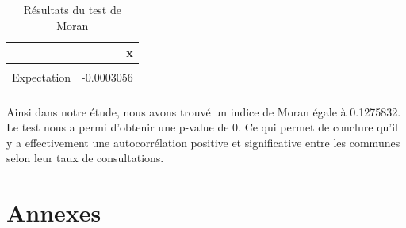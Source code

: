 \documentclass[
]{article}
\begin{document}
\begin{table}[H]

\caption{\label{tab:unnamed-chunk-20}Résultats du test de Moran}
\centering
\begin{tabular}[t]{lr}
\toprule
  & x\\
\midrule
\cellcolor{gray!6}{Moran I statistic} & \cellcolor{gray!6}{0.1275832}\\
Expectation & -0.0003056\\
\cellcolor{gray!6}{Variance} & \cellcolor{gray!6}{0.0000029}\\
\bottomrule
\end{tabular}
\end{table}

Ainsi dans notre étude, nous avons trouvé un indice de Moran égale à
0.1275832. Le test nous a permi d'obtenir une p-value de 0. Ce qui
permet de conclure qu'il y a effectivement une autocorrélation positive
et significative entre les communes selon leur taux de consultations.

\hypertarget{annexes}{%
\section{Annexes}\label{annexes}}
\end{document}
